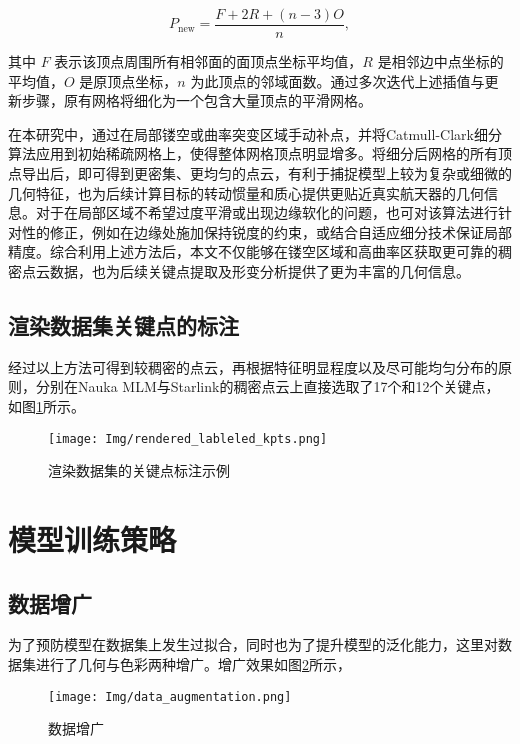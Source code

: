 \begin{equation}
	P_{\mathrm{new}} = \frac{F + 2R + (n-3)O}{n},
\end{equation}

其中 $F$ 表示该顶点周围所有相邻面的面顶点坐标平均值，$R$ 是相邻边中点坐标的平均值，$O$ 是原顶点坐标，$n$ 为此顶点的邻域面数。通过多次迭代上述插值与更新步骤，原有网格将细化为一个包含大量顶点的平滑网格。

在本研究中，通过在局部镂空或曲率突变区域手动补点，并将Catmull-Clark细分算法应用到初始稀疏网格上，使得整体网格顶点明显增多。将细分后网格的所有顶点导出后，即可得到更密集、更均匀的点云，有利于捕捉模型上较为复杂或细微的几何特征，也为后续计算目标的转动惯量和质心提供更贴近真实航天器的几何信息。对于在局部区域不希望过度平滑或出现边缘软化的问题，也可对该算法进行针对性的修正，例如在边缘处施加保持锐度的约束，或结合自适应细分技术保证局部精度。综合利用上述方法后，本文不仅能够在镂空区域和高曲率区获取更可靠的稠密点云数据，也为后续关键点提取及形变分析提供了更为丰富的几何信息。

\subsection{渲染数据集关键点的标注}

经过以上方法可得到较稠密的点云，再根据特征明显程度以及尽可能均匀分布的原则，分别在Nauka MLM与Starlink的稠密点云上直接选取了17个和12个关键点，如图\ref{fig:rendered_lableled_kpts}所示。

\begin{figure}[htbp]
	\centering
	\texttt{[image: Img/rendered\_lableled\_kpts.png]}
	\caption{渲染数据集的关键点标注示例}
	\label{fig:rendered_lableled_kpts}
	\vspace{-3ex}
\end{figure}



\section{模型训练策略}

\subsection{数据增广}
为了预防模型在数据集上发生过拟合，同时也为了提升模型的泛化能力，这里对数据集进行了几何与色彩两种增广。增广效果如图\ref{fig:data_augmentation}所示，
\begin{figure}[htbp]
	\centering
	\texttt{[image: Img/data\_augmentation.png]}
	\caption{数据增广}
	\label{fig:data_augmentation}
	\vspace{-3ex}
\end{figure}


